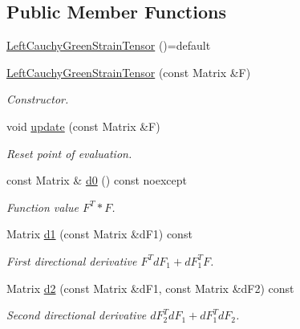 \subsection*{Public Member Functions}
\begin{DoxyCompactItemize}
\item 
\hyperlink{classfuncy_1_1LinearAlgebra_1_1LeftCauchyGreenStrainTensor_a4c3ecac70b06d4abcdd8bdf4e7251141}{Left\-Cauchy\-Green\-Strain\-Tensor} ()=default
\item 
\hyperlink{classfuncy_1_1LinearAlgebra_1_1LeftCauchyGreenStrainTensor_a6121c31dffb25fd4c509478d6352b05c}{Left\-Cauchy\-Green\-Strain\-Tensor} (const Matrix \&F)
\begin{DoxyCompactList}\small\item\em Constructor. \end{DoxyCompactList}\item 
void \hyperlink{classfuncy_1_1LinearAlgebra_1_1LeftCauchyGreenStrainTensor_a78032c68514aab3b7dbdded77fb63a0d}{update} (const Matrix \&F)
\begin{DoxyCompactList}\small\item\em Reset point of evaluation. \end{DoxyCompactList}\item 
const Matrix \& \hyperlink{classfuncy_1_1LinearAlgebra_1_1LeftCauchyGreenStrainTensor_a5b75935ea0cf951da89081dbfbe62efe}{d0} () const noexcept
\begin{DoxyCompactList}\small\item\em Function value $ F^T * F $. \end{DoxyCompactList}\item 
Matrix \hyperlink{classfuncy_1_1LinearAlgebra_1_1LeftCauchyGreenStrainTensor_afd6a026f3583a17b7f920498e676cd14}{d1} (const Matrix \&d\-F1) const 
\begin{DoxyCompactList}\small\item\em First directional derivative $ F^T dF_1 + dF_1^T F $. \end{DoxyCompactList}\item 
Matrix \hyperlink{classfuncy_1_1LinearAlgebra_1_1LeftCauchyGreenStrainTensor_a4cb634d24e6a2f0c80c5ddefacde5609}{d2} (const Matrix \&d\-F1, const Matrix \&d\-F2) const 
\begin{DoxyCompactList}\small\item\em Second directional derivative $ dF_2^T dF_1 + dF_1^T dF_2 $. \end{DoxyCompactList}\end{DoxyCompactItemize}


